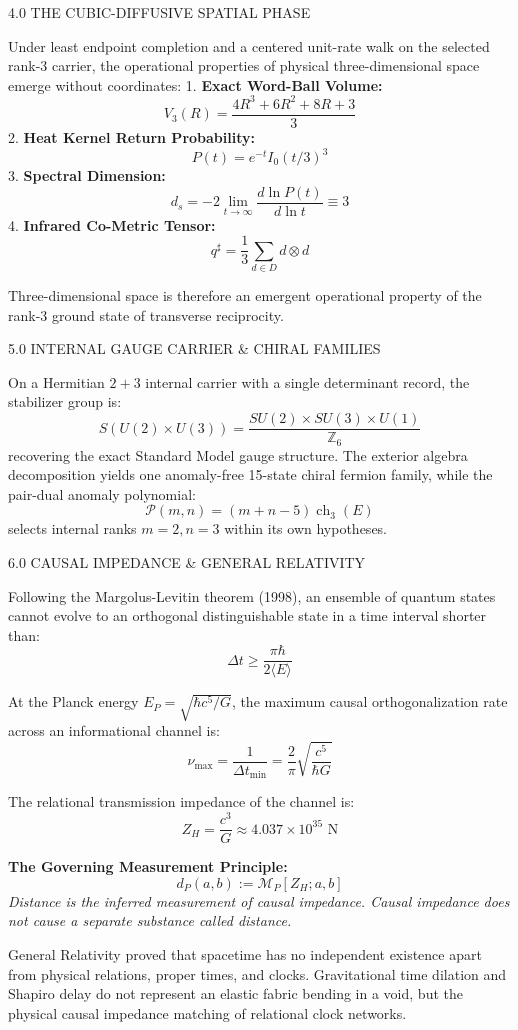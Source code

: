 \documentclass[12pt,twoside,openright]{book}
\newcommand{\sceneheader}[1]{%
  \par\vspace{1.8em}%
  {\noindent\centering\scshape\large #1\par}%
  \vspace{1.0em}%
  \noindent%
}
\begin{document}
\sceneheader{4.0 THE CUBIC-DIFFUSIVE SPATIAL
PHASE}

Under least endpoint completion and a centered unit-rate walk on the
selected rank-3 carrier, the operational properties of physical
three-dimensional space emerge without coordinates: 1. \textbf{Exact
Word-Ball Volume:} \[V_3(R) = \frac{4R^3 + 6R^2 + 8R + 3}{3}\] 2.
\textbf{Heat Kernel Return Probability:} \[P(t) = e^{-t} I_0(t/3)^3\] 3.
\textbf{Spectral Dimension:}
\[d_s = -2 \lim_{t \to \infty} \frac{d \ln P(t)}{d \ln t} \equiv 3\] 4.
\textbf{Infrared Co-Metric Tensor:}
\[q^\sharp = \frac{1}{3} \sum_{d \in D} d \otimes d\]

Three-dimensional space is therefore an emergent operational property of
the rank-3 ground state of transverse reciprocity.

\sceneheader{5.0 INTERNAL GAUGE CARRIER \& CHIRAL
FAMILIES}

On a Hermitian \(2+3\) internal carrier with a single determinant
record, the stabilizer group is:
\[S(U(2) \times U(3)) = \frac{SU(2) \times SU(3) \times U(1)}{\mathbb{Z}_6}\]
recovering the exact Standard Model gauge structure. The exterior
algebra decomposition yields one anomaly-free 15-state chiral fermion
family, while the pair-dual anomaly polynomial:
\[\mathcal{P}(m, n) = (m + n - 5) \operatorname{ch}_3(E)\] selects
internal ranks \(m=2, n=3\) within its own hypotheses.

\sceneheader{6.0 CAUSAL IMPEDANCE \& GENERAL
RELATIVITY}

Following the Margolus-Levitin theorem (1998), an ensemble of quantum
states cannot evolve to an orthogonal distinguishable state in a time
interval shorter than:
\[\Delta t \ge \frac{\pi \hbar}{2 \langle E \rangle}\]

At the Planck energy \(E_P = \sqrt{\hbar c^5 / G}\), the maximum causal
orthogonalization rate across an informational channel is:
\[\nu_{\max} = \frac{1}{\Delta t_{\min}} = \frac{2}{\pi} \sqrt{\frac{c^5}{\hbar G}}\]

The relational transmission impedance of the channel is:
\[Z_H = \frac{c^3}{G} \approx 4.037 \times 10^{35} \text{ N}\]

\textbf{The Governing Measurement Principle:}
\[d_P(a, b) := \mathcal{M}_P[Z_H; a, b]\] \emph{Distance is the inferred
measurement of causal impedance. Causal impedance does not cause a
separate substance called distance.}

General Relativity proved that spacetime has no independent existence
apart from physical relations, proper times, and clocks. Gravitational
time dilation and Shapiro delay do not represent an elastic fabric
bending in a void, but the physical causal impedance matching of
relational clock networks.
\end{document}
